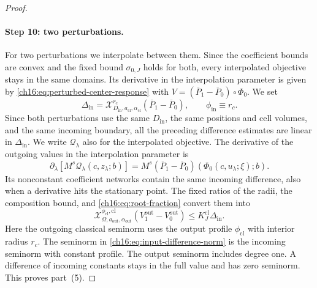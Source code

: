 \begin{proof}
\paragraph{Step 10: two perturbations.}
For two perturbations we interpolate between them. Since the coefficient bounds are convex and the fixed bound $\sigma_{0,J}$ holds for both, every interpolated objective stays in the same domains. Its derivative in the interpolation parameter is given by \eqref{ch16:eq:perturbed-center-response} with $V=(\overline P_1-\overline P_0)\circ\Phi_0$. We set
\begin{equation}\label{ch16:eq:input-difference-norm}
 \Delta_{\mathrm{in}}=
 \mathcal X_{D_{\mathrm{in}},a_{\mathrm{cl}},\alpha_{\mathrm{cl}}}^{r_c}
                  (\overline P_1-\overline P_0),
 \qquad \phi_{\mathrm{in}}\equiv r_c.
\end{equation}
Since both perturbations use the same $D_{\mathrm{in}}$, the same positions and cell volumes, and the same incoming boundary, all the preceding difference estimates are linear in $\Delta_{\mathrm{in}}$. We write $\mathcal Q_\lambda$ also for the interpolated objective. The derivative of the outgoing values in the interpolation parameter is
\[
 \partial_\lambda[M^s\mathcal Q_\lambda(c,z_\lambda;b)]
 =M^s(\overline P_1-\overline P_0)
                                     (\Phi_0(c,u_\lambda;\xi);b).
\]
Its nonconstant coefficient networks contain the same incoming difference, also when a derivative hits the stationary point. The fixed ratios of the radii, the composition bound, and \eqref{ch16:eq:root-fraction} convert them into
\begin{equation}\label{ch16:eq:output-lipschitz}
 \mathcal X_{\Omega,a_{\mathrm{out}},\alpha_{\mathrm{out}}}^{\phi_{\mathrm{cl}},
                    \mathrm{cl}}
       (V^{\mathrm{out}}_1-V^{\mathrm{out}}_0)
                       \le K_J^{\mathrm{cl}}\Delta_{\mathrm{in}}.
\end{equation}
Here the outgoing classical seminorm uses the output profile $\phi_{\mathrm{cl}}$ with interior radius $r_c$. The seminorm in \eqref{ch16:eq:input-difference-norm} is the incoming seminorm with constant profile. The output seminorm includes degree one. A difference of incoming constants stays in the full value and has zero seminorm. This proves part~(5).


\end{proof}

